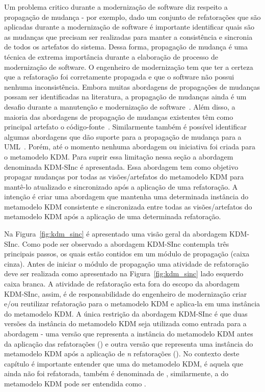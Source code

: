 Um problema critico durante a modernização de software diz respeito a propagação de mudança - por exemplo,  dado um conjunto de refatorações que são aplicadas durante a modernização de software é importante identificar quais são as mudanças que precisam ser realizadas para manter a consistência e sincronia de todos os artefatos do sistema. Dessa forma, propagação de mudança é uma técnica de extrema importância durante a elaboração de processo de modernização de software. O engenheiro de modernização tem que ter a certeza que a refatoração foi corretamente propagada e que o software não possui nenhuma inconsistência. Embora muitas abordagens de propagações de mudanças possam ser identificadas na literatura, a propagação de mudanças ainda é um desafio durante a manutenção e modernização de software~\cite{Tom_2008_roadmap}. Além disso, a maioria das abordagens de propagação de mudanças existentes têm como principal artefato o código-fonte~\cite{Vaclav_methodology, Deursen07model_drivensoftware}. Similarmente também é possível identificar algumas abordagens que dão suporte para a propagação de mudança para a UML~\cite{Egyed_2008,Liu02rule, Briand_2006}. Porém, até o momento nenhuma abordagem ou iniciativa foi criada para o metamodelo KDM. Para suprir essa limitação nessa seção a abordagem denominada KDM-SInc é apresentada. Essa abordagem tem como objetivo propagar mudanças por todas as visões/artefatos do metamodelo KDM para mantê-lo atualizado e sincronizado após a aplicação de uma refatoração. A intenção é criar uma abordagem que mantenha uma determinada instância do metamodelo KDM consistente e sincronizada entre todas as visões/artefatos do metamodelo KDM após a aplicação de uma determinada refatoração. 

Na Figura~\ref{fig:kdm_sinc} é apresentado uma visão geral da abordagem KDM-SInc. Como pode ser observado a abordagem KDM-SInc contempla três principais passos, os quais estão contidos em um módulo de propagação (caixa cinza). Antes de iniciar o módulo de propagação uma atividade de refatoração deve ser realizada como apresentado na Figura~\ref{fig:kdm_sinc} lado esquerdo caixa branca. A atividade de refatoração esta fora do escopo da abordagem KDM-SInc, assim, é de responsabilidade do engenheiro de modernização criar e/ou reutilizar refatoração para o metamodelo KDM e aplica-la em uma instância do metamodelo KDM. A única restrição da abordagem KDM-SInc é que duas versões da instância do metamodelo KDM seja utilizada como entrada para a abordagem - uma versão que representa a instância do metamodelo KDM antes da aplicação das refatorações () e outra versão que representa uma instância do metamodelo KDM após a aplicação de \textit{n} refatorações (). No contexto deste capítulo é importante entender que uma  do metamodelo KDM, é aquela que ainda não foi refatorada, também é denominada de , similarmente, a  do metamodelo KDM pode ser entendida como . 

